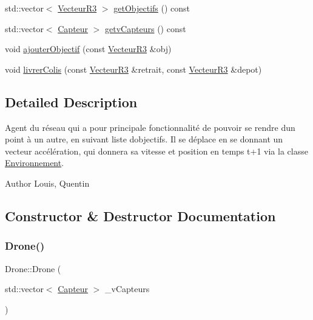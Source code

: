 \begin{DoxyCompactItemize}
\item 
std\+::vector$<$ \mbox{\hyperlink{class_vecteur_r3}{Vecteur\+R3}} $>$ \mbox{\hyperlink{class_drone_af1aae2a61acd717ecec989b51d744002}{get\+Objectifs}} () const
\item 
std\+::vector$<$ \mbox{\hyperlink{class_capteur}{Capteur}} $>$ \mbox{\hyperlink{class_drone_a584920a6f64ab0514f835354755af0ab}{getv\+Capteurs}} () const
\item 
void \mbox{\hyperlink{class_drone_aec517cb61a036852752219bad4e732c1}{ajouter\+Objectif}} (const \mbox{\hyperlink{class_vecteur_r3}{Vecteur\+R3}} \&obj)
\item 
void \mbox{\hyperlink{class_drone_ae7249a3f0c054e2c1beb6ea522774029}{livrer\+Colis}} (const \mbox{\hyperlink{class_vecteur_r3}{Vecteur\+R3}} \&retrait, const \mbox{\hyperlink{class_vecteur_r3}{Vecteur\+R3}} \&depot)
\end{DoxyCompactItemize}


\subsection{Detailed Description}
Agent du réseau qui a pour principale fonctionnalité de pouvoir se rendre d\textquotesingle{}un point à un autre, en suivant liste d\textquotesingle{}objectifs. Il se déplace en se donnant un vecteur accélération, qui donnera sa vitesse et position en temps t+1 via la classe \mbox{\hyperlink{class_environnement}{Environnement}}. \begin{DoxyAuthor}{Author}
Louis, Quentin 
\end{DoxyAuthor}


\subsection{Constructor \& Destructor Documentation}
\mbox{\label{class_drone_add4812090fe80b1beb2eade5dedc20ce}} 
\subsubsection{\texorpdfstring{Drone()}{Drone()}\hspace{0.1cm}{\footnotesize\ttfamily [1/6]}}
{\footnotesize\ttfamily Drone\+::\+Drone (\begin{DoxyParamCaption}\item[{std\+::vector$<$ \mbox{\hyperlink{class_capteur}{Capteur}} $>$}]{\+\_\+v\+Capteurs }\end{DoxyParamCaption})}

